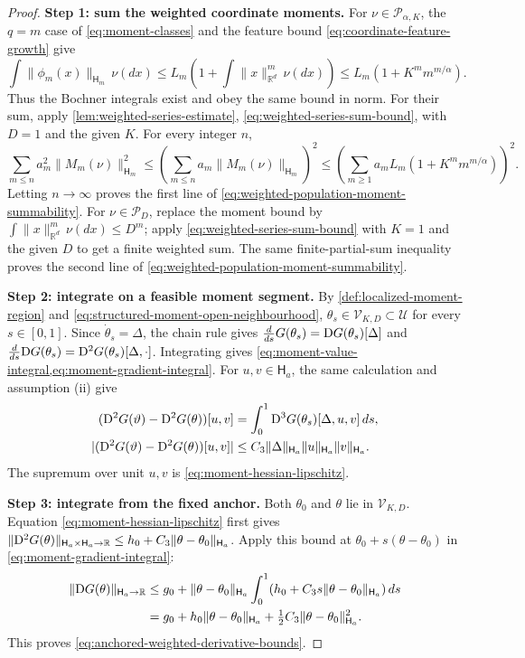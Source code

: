 \begin{proof}
\noindent\textbf{Step 1: sum the weighted coordinate moments.}
For $\nu\in\mathcal P_{\alpha,K}$, the $q=m$ case of
\eqref{eq:moment-classes} and the feature bound
\eqref{eq:coordinate-feature-growth} give
\[
 \int\|\phi_m(x)\|_{\mathsf H_m}\,\nu(dx)
 \le L_m\left(1+\int\|x\|_{\mathbb R^d}^m\,\nu(dx)\right)
 \le L_m(1+K^m m^{m/\alpha}).
\]
Thus the Bochner integrals exist and obey the same bound in norm.
For their sum, apply \cref{lem:weighted-series-estimate},
\eqref{eq:weighted-series-sum-bound}, with $D=1$ and the given $K$.
For every integer $n$,
\[
 \sum_{m\le n}a_m^2\|M_m(\nu)\|_{\mathsf H_m}^2
 \le\left(\sum_{m\le n}a_m\|M_m(\nu)\|_{\mathsf H_m}\right)^2
 \le\left(\sum_{m\ge1}a_mL_m(1+K^m m^{m/\alpha})\right)^2.
\]
Letting $n\to\infty$ proves the first line of
\eqref{eq:weighted-population-moment-summability}.
For $\nu\in\mathcal P_D$, replace the moment bound by
$\int\|x\|_{\mathbb R^d}^m\,\nu(dx)\le D^m$; apply \eqref{eq:weighted-series-sum-bound} with $K=1$ and the
given $D$ to get a finite weighted sum. The same finite-partial-sum
inequality proves the second line of \eqref{eq:weighted-population-moment-summability}.

\par\noindent\textbf{Step 2: integrate on a feasible moment segment.}
By \cref{def:localized-moment-region} and
\eqref{eq:structured-moment-open-neighbourhood},
$\theta_s\in\mathcal V_{K,D}\subset\mathcal U$ for every $s\in[0,1]$.
Since $\dot\theta_s=\Delta$, the chain rule gives
$\frac{d}{ds}G(\theta_s)=\mathrm{D} G(\theta_s)[\Delta]$ and
$\frac{d}{ds}\mathrm{D} G(\theta_s)=\mathrm{D}^2G(\theta_s)[\Delta,\cdot]$.
Integrating gives
\cref{eq:moment-value-integral,eq:moment-gradient-integral}.
For $u,v\in\mathsf H_a$, the same calculation and assumption (ii) give
\[
\begin{aligned}
 (\mathrm{D}^2G(\vartheta)-\mathrm{D}^2G(\theta))[u,v]
 &=\int_0^1\mathrm{D}^3G(\theta_s)[\Delta,u,v]\,ds,\\
 |(\mathrm{D}^2G(\vartheta)-\mathrm{D}^2G(\theta))[u,v]|
 &\le C_3\|\Delta\|_{\mathsf H_a}\|u\|_{\mathsf H_a}\|v\|_{\mathsf H_a}.
\end{aligned}
\]
The supremum over unit $u,v$ is
\eqref{eq:moment-hessian-lipschitz}.

\par\noindent\textbf{Step 3: integrate from the fixed anchor.}
Both $\theta_0$ and $\theta$ lie in $\mathcal V_{K,D}$.
Equation \eqref{eq:moment-hessian-lipschitz} first gives
$\|\mathrm{D}^2G(\theta)\|_{\mathsf H_a\times\mathsf H_a\to\mathbb R}\le h_0+C_3\|\theta-\theta_0\|_{\mathsf H_a}$.
Apply this bound at $\theta_0+s(\theta-\theta_0)$ in
\eqref{eq:moment-gradient-integral}:
\[
\begin{aligned}
 \|\mathrm{D} G(\theta)\|_{\mathsf H_a\to\mathbb R}
 &\le g_0+\|\theta-\theta_0\|_{\mathsf H_a}
       \int_0^1(h_0+C_3s\|\theta-\theta_0\|_{\mathsf H_a})\,ds\\
 &=g_0+h_0\|\theta-\theta_0\|_{\mathsf H_a}
          +\tfrac12 C_3\|\theta-\theta_0\|_{\mathsf H_a}^2.
\end{aligned}
\]
This proves \eqref{eq:anchored-weighted-derivative-bounds}.
\end{proof}

